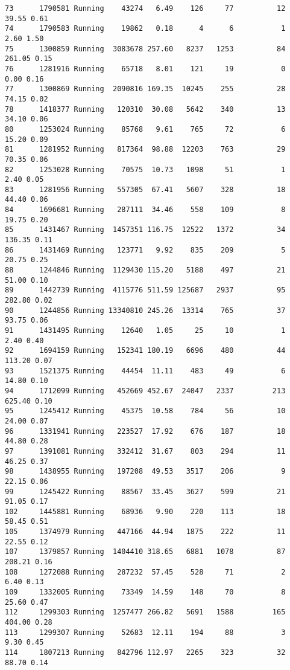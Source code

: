 \documentclass[
]{article}
\begin{document}
\begin{verbatim}
73      1790581 Running    43274   6.49    126     77          12   39.55 0.61
74      1790583 Running    19862   0.18      4      6           1    2.60 1.50
75      1300859 Running  3083678 257.60   8237   1253          84  261.05 0.15
76      1281916 Running    65718   8.01    121     19           0    0.00 0.16
77      1300869 Running  2090816 169.35  10245    255          28   74.15 0.02
78      1418377 Running   120310  30.08   5642    340          13   34.10 0.06
80      1253024 Running    85768   9.61    765     72           6   15.20 0.09
81      1281952 Running   817364  98.88  12203    763          29   70.35 0.06
82      1253028 Running    70575  10.73   1098     51           1    2.40 0.05
83      1281956 Running   557305  67.41   5607    328          18   44.40 0.06
84      1696681 Running   287111  34.46    558    109           8   19.75 0.20
85      1431467 Running  1457351 116.75  12522   1372          34  136.35 0.11
86      1431469 Running   123771   9.92    835    209           5   20.75 0.25
88      1244846 Running  1129430 115.20   5188    497          21   51.00 0.10
89      1442739 Running  4115776 511.59 125687   2937          95  282.80 0.02
90      1244856 Running 13340810 245.26  13314    765          37   93.75 0.06
91      1431495 Running    12640   1.05     25     10           1    2.40 0.40
92      1694159 Running   152341 180.19   6696    480          44  113.20 0.07
93      1521375 Running    44454  11.11    483     49           6   14.80 0.10
94      1712099 Running   452669 452.67  24047   2337         213  625.40 0.10
95      1245412 Running    45375  10.58    784     56          10   24.00 0.07
96      1331941 Running   223527  17.92    676    187          18   44.80 0.28
97      1391081 Running   332412  31.67    803    294          11   46.25 0.37
98      1438955 Running   197208  49.53   3517    206           9   22.15 0.06
99      1245422 Running    88567  33.45   3627    599          21   91.05 0.17
102     1445881 Running    68936   9.90    220    113          18   58.45 0.51
105     1374979 Running   447166  44.94   1875    222          11   22.55 0.12
107     1379857 Running  1404410 318.65   6881   1078          87  208.21 0.16
108     1272088 Running   287232  57.45    528     71           2    6.40 0.13
109     1332005 Running    73349  14.59    148     70           8   25.60 0.47
112     1299303 Running  1257477 266.82   5691   1588         165  404.00 0.28
113     1299307 Running    52683  12.11    194     88           3    9.30 0.45
114     1807213 Running   842796 112.97   2265    323          32   88.70 0.14

\end{verbatim}
\end{document}
